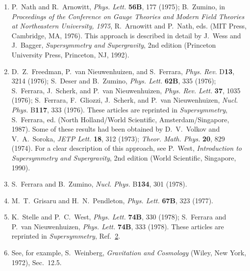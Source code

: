 \begin{enumerate}
  \item {}\label{ch31-ref-1}
  P.~Nath and R.~Arnowitt, \textit{Phys. Lett.} \textbf{56B}, 177
  (1975); B.~Zumino, in \textit{Proceedings of the Conference on Gauge
  Theories and Modern Field Theories at Northeastern University, 1975},
  R.~Arnowitt and P.~Nath, eds. (MIT Press, Cambridge, MA, 1976). This
  approach is described in detail by J.~Wess and J.~Bagger,
  \textit{Supersymmetry and Supergravity}, 2nd edition (Princeton
  University Press, Princeton, NJ, 1992).

  \item {}\label{ch31-ref-2}
  D.~Z.~Freedman, P.~van Nieuwenhuizen, and S.~Ferrara,
  \textit{Phys. Rev.} D\textbf{13}, 3214 (1976); S.~Deser and
  B.~Zumino, \textit{Phys. Lett.} \textbf{62B}, 335 (1976);
  S.~Ferrara, J.~Scherk, and P.~van Nieuwenhuizen,
  \textit{Phys. Rev. Lett.} \textbf{37}, 1035 (1976); S.~Ferrara,
  F.~Gliozzi, J.~Scherk, and P.~van Nieuwenhuizen,
  \textit{Nucl. Phys.} B\textbf{117}, 333 (1976). These articles are
  reprinted in \textit{Supersymmetry}, S.~Ferrara, ed. (North
  Holland/World Scientific, Amsterdam/Singapore, 1987). Some of these
  results had been obtained by D.~V.~Volkov and V.~A.~Soroka,
  \textit{JETP Lett.} \textbf{18}, 312 (1973);
  \textit{Theor. Math. Phys.} \textbf{20}, 829 (1974). For a clear
  description of this approach, see P.~West, \textit{Introduction to
  Supersymmetry and Supergravity}, 2nd edition (World Scientific,
  Singapore, 1990).

  \item {}\label{ch31-ref-3}
  S.~Ferrara and B.~Zumino, \textit{Nucl. Phys.} B\textbf{134}, 301
  (1978).

  \item[3a.] \label{ch31-ref-3a}
  M.~T.~Grisaru and H.~N.~Pendleton, \textit{Phys. Lett.}
  \textbf{67B}, 323 (1977).

  \item {}\label{ch31-ref-4}
  K.~Stelle and P.~C.~West, \textit{Phys. Lett.} \textbf{74B}, 330
  (1978); S.~Ferrara and P.~van Nieuwenhuizen, \textit{Phys. Lett.}
  \textbf{74B}, 333 (1978). These articles are reprinted in
  \textit{Supersymmetry}, Ref.~\hyperref[ch31-ref-2]{2}.

  \item {}\label{ch31-ref-5}
  See, for example, S.~Weinberg, \textit{Gravitation and Cosmology}
  (Wiley, New York, 1972), Sec.~12.5.


\end{enumerate}
